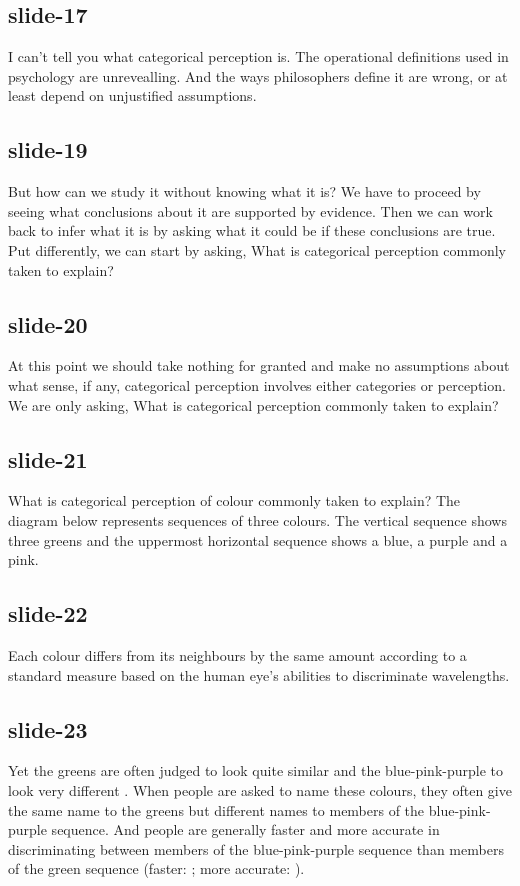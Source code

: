 \documentclass[12pt,\papersize]{extarticle}
\begin{document}
 
\subsection{slide-17}
I can't tell you what categorical perception is.
The operational definitions used in psychology are unrevealling.
And the ways philosophers define it are wrong, or at least depend on unjustified assumptions.
 
 
\subsection{slide-19}
But how can we study it without knowing what it is?
We have to proceed by seeing what conclusions about it are supported by evidence.
Then we can work back to infer what it is by asking what it could be if these conclusions are true.
Put differently, we can start by asking, What is categorical perception commonly taken to explain?
 
 
\subsection{slide-20}
At this point we should take nothing for granted and make no assumptions about what sense, if any, categorical perception involves either categories or perception.
We are only asking, What is categorical perception commonly taken to explain?
 
 
\subsection{slide-21}
What is categorical perception of colour commonly taken to explain?
The diagram below represents sequences of three colours.
The vertical sequence shows three greens and the uppermost horizontal sequence shows a blue, a purple and a pink.
 
 
\subsection{slide-22}
Each colour differs from its neighbours by the same amount according to a standard measure based on the human eye's abilities to discriminate wavelengths.
 
 
\subsection{slide-23}
Yet the greens are often judged to look quite similar and the blue-pink-purple to look very different \citep[p.\ 12--7]{Roberson:1999rk}.
When people are asked to name these colours, they often give the same name to the greens but different names to members of the blue-pink-purple sequence.
And people are generally faster and more accurate in discriminating between members of the blue-pink-purple sequence than members of the green sequence (faster: \citealp{Bornstein:1984cb}; more accurate: \citealp[p.\ 22--7]{Roberson:1999rk}).
 
\end{document}
